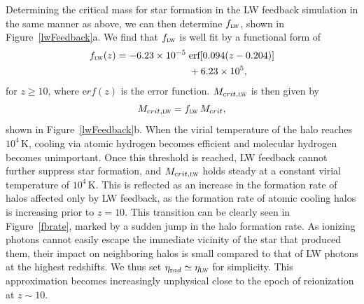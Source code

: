 \documentclass{thesis}
\newcommand{\RefFig}[1]{\mbox{Figure~\ref{#1}}}
\begin{document}
Determining the critical mass for star formation in the LW feedback
simulation in the same manner as above, we can then determine
$f_{\textsc{lw}}$, shown in \RefFig{lwFeedback}a.  We find that
$f_{\textsc{lw}}$ is well fit by a functional form of
\begin{equation}
  \label{flweq}
  \begin{split}
 f_{\textsc{lw}}(z) = -6.23\times10^{-5} \;
 &\textrm{erf}[0.094 (z - 0.204)] \\
 &+ 6. 23\times10^{5},
 \end{split}
\end{equation}
for $z\geq10$, where ${\mathrm erf}(z)$ is the error function.
$M_{\mathrm crit, \textsc{lw}}$ is then given by
\begin{equation}
  \label{mcritlweq}
M_{\mathrm crit, \textsc{lw}} = f_{\textsc{lw}} \,M_{\mathrm crit},
\end{equation}
shown in \RefFig{lwFeedback}b.  When the virial temperature of the
halo reaches $10^4\,$K, cooling via atomic hydrogen becomes efficient
and molecular hydrogen becomes unimportant.  Once this threshold is
reached, LW feedback cannot further suppress star formation, and
$M_{\mathrm crit, \textsc{lw}}$ holds steady at a constant virial
temperature of $10^4\,$K.  This is reflected as an increase in the
formation rate of halos affected only by LW feedback, as the formation
rate of atomic cooling halos is increasing prior to $z=10$.  This
transition can be clearly seen in \RefFig{fbrate}, marked by a sudden
jump in the halo formation rate.  As ionizing photons cannot easily
escape the immediate vicinity of the star that produced them, their
impact on neighboring halos is small compared to that of LW photons at
the highest redshifts.  We thus set $\eta_{\mathrm rad} \simeq
\eta_{\textsc{lw}}$ for simplicity.  This approximation becomes
increasingly unphysical close to the epoch of reionization at
$z\sim10$.
\end{document}
